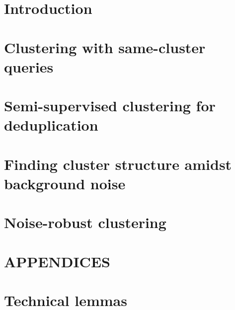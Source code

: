 \documentclass[letterpaper,12pt,titlepage,oneside,final]{book}
\let\origdoublepage\cleardoublepage
\newcommand{\clearemptydoublepage}{%
  \clearpage{\pagestyle{empty}\origdoublepage}}
\let\cleardoublepage\clearemptydoublepage
\begin{document}
 

\chapter{Introduction}
\label{chapter:introduction}


\chapter{Clustering with same-cluster queries}
\label{chapter:activeClustering}

\begin{subappendices}

\end{subappendices}

\chapter{Semi-supervised clustering for deduplication}
\label{chapter:deDuplication}


\begin{subappendices}

\end{subappendices}

\chapter{Finding cluster structure amidst background noise}
\label{chapter:clusteringNoise}

\begin{subappendices}

\end{subappendices}

\chapter{Noise-robust clustering}
\label{chapter:optimizationClustering}

\begin{subappendices}

\end{subappendices}

\cleardoublepage 
{}  

\renewcommand*{\bibname}{References}




\appendix
\chapter*{APPENDICES}
\chapter[Technical lemmas]{Technical lemmas}
\label{appendix:technicalLemmas}

\end{document}
